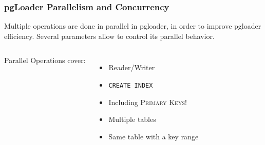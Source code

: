 \documentclass{beamer}
\begin{document}
{

  \begin{frame}[fragile]
    \frametitle{pgLoader Parallelism and Concurrency}

    Multiple operations are done in parallel in pgloader, in order to
    improve pgloader efficiency. Several parameters allow to control its
    parallel behavior.

    \vfill
    
    \begin{columns}[c]
      Parallel Operations cover:
      \begin{itemize}
      \item Reader/Writer
      \item \texttt{CREATE INDEX}
      \item Including \textsc{Primary Keys!}
      \item Multiple tables
      \item Same table with a key range
      \end{itemize}

    \end{columns}  
  \end{frame}
}
\end{document}
